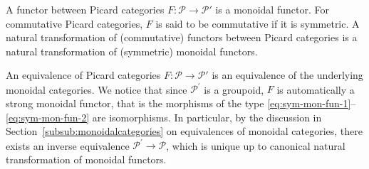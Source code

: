 \documentclass[JEP,XML,SOM,Unicode,published]{cedram}
\theoremstyle{plain}
\theoremstyle{definition}
\newcommand{\Pcal}{\mathcal P}
\begin{document}
A functor between Picard categories $F: \Pcal \to \Pcal'$ is a monoidal functor. For commutative Picard categories, $F$ is said to be commutative if it is symmetric. A natural transformation of (commutative) functors between Picard categories is a natural transformation of (symmetric) monoidal functors.

An equivalence of Picard categories $F: \Pcal \to \Pcal'$ is an equivalence of the underlying monoidal categories. We notice that since $\Pcal^{\prime}$ is a groupoid, $F$ is automatically a strong monoidal functor, that is the morphisms of the type \eqref{eq:sym-mon-fun-1}--\eqref{eq:sym-mon-fun-2} are isomorphisms. In particular, by the discussion in Section~\ref{subsub:monoidalcategories} on equivalences of monoidal categories, there exists an inverse equivalence $\Pcal^{\prime}\to\Pcal$, which is unique up to canonical natural transformation of monoidal functors.
\end{document}

